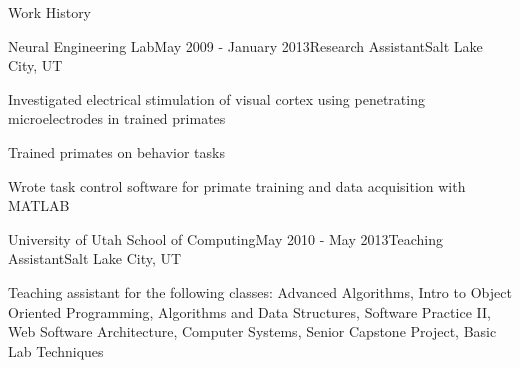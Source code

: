 \documentclass{resume} %
\begin{document}
\begin{rSection}{Work History}


\begin{rSubsection}{Neural Engineering Lab}{May 2009 - January 2013}{Research Assistant}{Salt Lake City, UT}
\item Investigated electrical stimulation of visual cortex using penetrating microelectrodes in trained primates
\item Trained primates on behavior tasks
\item Wrote task control software for primate training and data acquisition with MATLAB
\end{rSubsection}


\begin{rSubsection}{University of Utah School of Computing}{May 2010 - May 2013}{Teaching Assistant}{Salt Lake City, UT}
\item Teaching assistant for the following classes: Advanced Algorithms, Intro to Object Oriented Programming, Algorithms and Data Structures, Software Practice II, Web Software Architecture, Computer Systems, Senior Capstone Project, Basic Lab Techniques
\end{rSubsection}




\end{rSection}
\end{document}
